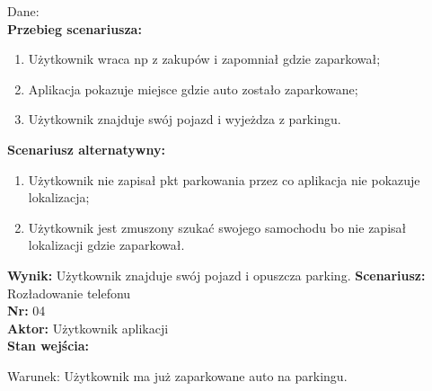 \documentclass[12pt,a4paper]{article}
\begin{document}
Dane:
\\{\bf Przebieg scenariusza:}
\begin{enumerate}
\item Użytkownik wraca np z zakupów i zapomniał gdzie zaparkował;
\item Aplikacja pokazuje miejsce gdzie auto zostało zaparkowane;
\item Użytkownik znajduje swój pojazd i wyjeżdza z parkingu.
\end{enumerate}
{\bf Scenariusz alternatywny:}
\begin{enumerate}
\item Użytkownik nie zapisał pkt parkowania przez co aplikacja nie pokazuje lokalizacja;
\item Użytkownik jest zmuszony szukać swojego samochodu  bo nie zapisał lokalizacji gdzie zaparkował.
\end{enumerate}
{\bf Wynik:} Użytkownik znajduje swój pojazd i opuszcza parking.
\newline\newline\newline\newline\newline\newline\newline\newline\newline\newline\newline\newline\newline\newline\newline\newline\newline\newline\newline\newline\newline\newline\newline\newline\newline\newline
{\large \bf Scenariusz:} Rozładowanie telefonu
\\{\bf Nr:} 04
\\{\bf Aktor:} Użytkownik aplikacji
\\{\bf Stan wejścia:}

Warunek: Użytkownik ma już zaparkowane auto na parkingu.
\end{document}
